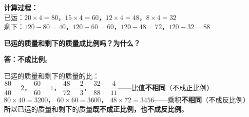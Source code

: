 \vspace{0.4cm}

{
\small\color{gray}
\textbf{计算过程：}\\
已运：$20\times4=80$，$15\times4=60$，$12\times4=48$，$8\times4=32$\\
剩下：$120-80=40$，$120-60=60$，$120-48=72$，$120-32=88$
}

\vspace{0.5cm}

\noindent
\textbf{已运的质量和剩下的质量成比例吗？为什么？}

\vspace{0.3cm}

\noindent
\textbf{答：}\textbf{\textcolor{red!70!black}{不成比例}}。

\vspace{0.3cm}

\noindent
{\small
已运的质量和剩下的质量的比：\\[4pt]
$\dfrac{80}{40} = 2$，\quad
$\dfrac{60}{60} = 1$，\quad
$\dfrac{48}{72} = \dfrac{2}{3}$，\quad
$\dfrac{32}{88} = \dfrac{4}{11}$\quad ——比值\textbf{不相同}（不成正比例）\\[6pt]
$80 \times 40 = 3200$，\quad
$60 \times 60 = 3600$，\quad
$48 \times 72 = 3456$\quad ——乘积\textbf{不相同}（不成反比例）\\[6pt]
所以已运的质量和剩下的质量\textbf{既不成正比例，也不成反比例}。
}


\newpage
